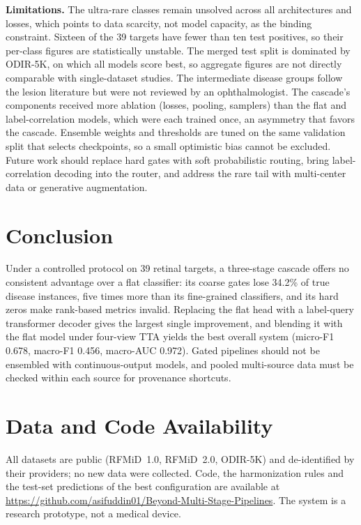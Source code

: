 \documentclass[conference]{IEEEtran}
\begin{document}
\textbf{Limitations.} The ultra-rare classes remain unsolved across all architectures
and losses, which points to data scarcity, not model capacity, as the binding
constraint. Sixteen of the 39 targets have fewer than ten test
positives, so their per-class figures are statistically unstable. The merged test
split is dominated by ODIR-5K, on which all models score best, so aggregate figures
are not directly comparable with single-dataset studies. The intermediate disease
groups follow the lesion literature but were not reviewed by an ophthalmologist.
The cascade's components received more ablation (losses, pooling, samplers) than
the flat and label-correlation models, which were each trained once, an asymmetry
that favors the cascade. Ensemble weights and thresholds are tuned on the same
validation split that selects checkpoints, so a small optimistic bias cannot be
excluded. Future work should replace hard gates with soft probabilistic routing,
bring label-correlation decoding into the router, and address the rare tail with
multi-center data or generative augmentation.

\section{Conclusion}
Under a controlled protocol on 39 retinal targets, a three-stage cascade offers no
consistent advantage over a flat classifier: its coarse gates lose 34.2\% of true
disease instances, five times more than its fine-grained classifiers, and its
hard zeros make rank-based metrics invalid. Replacing the flat head with a
label-query transformer decoder gives the largest single improvement, and blending
it with the flat model under four-view TTA yields the best overall system (micro-F1
0.678, macro-F1 0.456, macro-AUC 0.972). Gated pipelines should not be ensembled
with continuous-output models, and pooled multi-source data must be checked
within each source for provenance shortcuts.

\section*{Data and Code Availability}
All datasets are public (RFMiD~1.0, RFMiD~2.0, ODIR-5K) and de-identified by their
providers; no new data were collected. Code, the harmonization rules and the
test-set predictions of the best configuration are available at
\url{https://github.com/asifuddin01/Beyond-Multi-Stage-Pipelines}. The system is a
research prototype, not a medical device.
\end{document}
